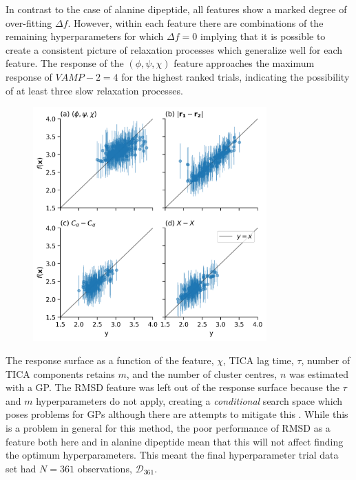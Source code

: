 In contrast to the case of alanine dipeptide, all features show a marked degree of over-fitting $\Delta f$. However, within each feature there are combinations of the remaining hyperparameters for which $\Delta f=0$ implying that it is possible to create a consistent picture of relaxation processes which generalize well for each feature. The response of the $(\phi, \psi, \chi)$ feature  approaches the maximum response of $VAMP-2 = 4$ for the highest ranked trials, indicating the possibility of at least three slow relaxation processes. 

\begin{figure}
    \centering
    \includegraphics[width=0.8\textwidth]{chapters/msm_optimization/figures/aadh_response_surface_fit_d.png}
    \label{fig:aadh_rsm_fit}
\end{figure}

The response surface as a function of the feature, $\chi$, TICA lag time, $\tau$, number of TICA components retains $m$, and the number of cluster centres, $n$ was estimated with a GP. The RMSD feature was left out of the response surface because the $\tau$ and $m$ hyperparameters do not apply, creating a \emph{conditional} search space \cite{bergstraAlgorithmsHyperParameterOptimizationa} which  poses problems for GPs although there are attempts to mitigate this \cite{swerskyRaidersLostArchitecture2014}. While this is a problem in general for this method, the poor performance of RMSD as a feature both here and in alanine dipeptide mean that this will not affect finding the optimum hyperparameters. This meant the final hyperparameter trial data set had $N=361$ observations, $\mathcal{D}_{361}$. 

